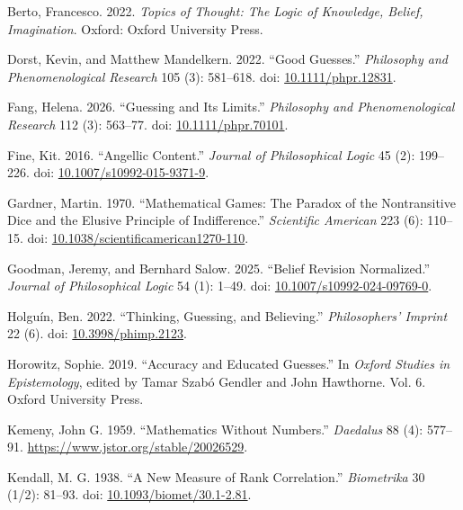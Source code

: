 \documentclass[
  11pt,
  letterpaper,
  DIV=11,
  numbers=noendperiod,
  twoside]{scrartcl}
\newlength{\cslhangindent}
\newenvironment{CSLReferences}[2] %
 {\begin{list}{}{%
  \setlength{\itemindent}{0pt}
  \setlength{\leftmargin}{0pt}
  \setlength{\parsep}{0pt}
  \ifodd #1
   \setlength{\leftmargin}{\cslhangindent}
   \setlength{\itemindent}{-1\cslhangindent}
  \fi
  \setlength{\itemsep}{#2\baselineskip}}}
 {\end{list}}
\begin{document}
\protect{}\label{refs}
\begin{CSLReferences}{1}{0}
Berto, Francesco. 2022. \emph{Topics of Thought: The Logic of Knowledge,
Belief, Imagination}. Oxford: Oxford University Press.

Dorst, Kevin, and Matthew Mandelkern. 2022. {``Good Guesses.''}
\emph{Philosophy and Phenomenological Research} 105 (3): 581--618. doi:
\href{https://doi.org/10.1111/phpr.12831}{10.1111/phpr.12831}.

Fang, Helena. 2026. {``Guessing and Its Limits.''} \emph{Philosophy and
Phenomenological Research} 112 (3): 563--77. doi:
\href{https://doi.org/10.1111/phpr.70101}{10.1111/phpr.70101}.

Fine, Kit. 2016. {``Angellic Content.''} \emph{Journal of Philosophical
Logic} 45 (2): 199--226. doi:
\href{https://doi.org/10.1007/s10992-015-9371-9}{10.1007/s10992-015-9371-9}.

Gardner, Martin. 1970. {``Mathematical Games: The Paradox of the
Nontransitive Dice and the Elusive Principle of Indifference.''}
\emph{Scientific American} 223 (6): 110--15. doi:
\href{https://doi.org/10.1038/scientificamerican1270-110}{10.1038/scientificamerican1270-110}.

Goodman, Jeremy, and Bernhard Salow. 2025. {``Belief Revision
Normalized.''} \emph{Journal of Philosophical Logic} 54 (1): 1--49. doi:
\href{https://doi.org/10.1007/s10992-024-09769-0}{10.1007/s10992-024-09769-0}.

Holguín, Ben. 2022. {``Thinking, Guessing, and Believing.''}
\emph{Philosophers' Imprint} 22 (6). doi:
\href{https://doi.org/10.3998/phimp.2123}{10.3998/phimp.2123}.

Horowitz, Sophie. 2019. {``Accuracy and Educated Guesses.''} In
\emph{Oxford Studies in Epistemology}, edited by Tamar Szabó Gendler and
John Hawthorne. Vol. 6. Oxford University Press.

Kemeny, John G. 1959. {``Mathematics Without Numbers.''} \emph{Daedalus}
88 (4): 577--91. \url{https://www.jstor.org/stable/20026529}.

Kendall, M. G. 1938. {``A New Measure of Rank Correlation.''}
\emph{Biometrika} 30 (1/2): 81--93. doi:
\href{https://doi.org/10.1093/biomet/30.1-2.81}{10.1093/biomet/30.1-2.81}.


\end{CSLReferences}
\end{document}
